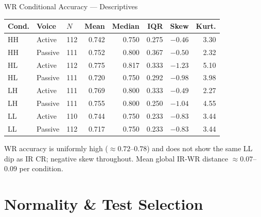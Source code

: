 \documentclass[aspectratio=169, 10pt]{beamer}
\begin{document}
\begin{frame}{WR Conditional Accuracy — Descriptives}
  \renewcommand{\arraystretch}{1.15}
  \begin{center}
  \small
  \begin{tabular}{lllrrrrr}
    \toprule
    \textbf{Cond.} & \textbf{Voice} & $N$ & \textbf{Mean} & \textbf{Median} & \textbf{IQR} & \textbf{Skew} & \textbf{Kurt.} \\
    \midrule
    HH & Active  & 112 & 0.742 & 0.750 & 0.275 & $-0.46$ & 3.30 \\
    HH & Passive & 111 & 0.752 & 0.800 & 0.367 & $-0.50$ & 2.32 \\
    \addlinespace
    HL & Active  & 112 & 0.775 & 0.817 & 0.333 & $-1.23$ & 5.10 \\
    HL & Passive & 111 & 0.720 & 0.750 & 0.292 & $-0.98$ & 3.98 \\
    \addlinespace
    LH & Active  & 111 & 0.769 & 0.800 & 0.333 & $-0.49$ & 2.27 \\
    LH & Passive & 111 & 0.755 & 0.800 & 0.250 & $-1.04$ & 4.55 \\
    \addlinespace
    LL & Active  & 110 & 0.744 & 0.750 & 0.233 & $-0.83$ & 3.44 \\
    LL & Passive & 112 & 0.717 & 0.750 & 0.233 & $-0.83$ & 3.44  \\
    \bottomrule
  \end{tabular}
  \end{center}
  \vspace{0.3em}
  \small WR accuracy is uniformly high ($\approx 0.72$–$0.78$) and does not
  show the same LL dip as IR CR; negative skew throughout.
  Mean global IR-WR distance $\approx 0.07$--$0.09$ per condition.
\end{frame}

\section{Normality \& Test Selection}
\end{document}
